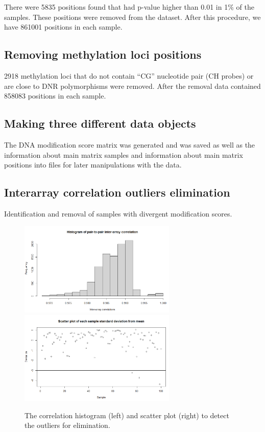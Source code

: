 \documentclass[
]{article}
\begin{document}
There were 5835 positions found that had p-value higher than 0.01 in 1\%
of the samples. These positions were removed from the dataset. After
this procedure, we have 861001 positions in each sample.

\hypertarget{removing-methylation-loci-positions}{%
\subsection{Removing methylation loci
positions}\label{removing-methylation-loci-positions}}

2918 methylation loci that do not contain ``CG'' nucleotide pair (CH
probes) or are close to DNR polymorphisms were removed. After the
removal data contained 858083 positions in each sample.

\hypertarget{making-three-different-data-objects}{%
\subsection{Making three different data
objects}\label{making-three-different-data-objects}}

The DNA modification score matrix was generated and was saved as well as
the information about main matrix samples and information about main
matrix positions into files for later manipulations with the data.

\pagebreak

\hypertarget{interarray-correlation-outliers-elimination}{%
\subsection{Interarray correlation outliers
elimination}\label{interarray-correlation-outliers-elimination}}

Identification and removal of samples with divergent modification
scores.

\begin{figure}[!h]
  \begin{center}
    \includegraphics[width=75mm]{./1.png}
    \includegraphics[width=75mm]{./2.png}
    \caption{
    The correlation histogram (left) and scatter plot (right) to detect the 
    outliers for elimination.
    }
  \end{center}
\end{figure}
\end{document}
